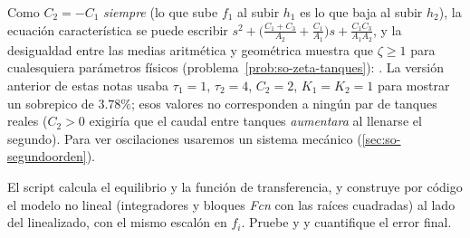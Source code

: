 \begin{cuidado}
Como $C_2=-C_1$ \emph{siempre} (lo que sube $f_1$ al subir $h_1$ es lo que baja al subir $h_2$), la ecuación característica se puede escribir $s^2+\bigl(\tfrac{C_1+C_3}{A_2}+\tfrac{C_1}{A_1}\bigr)s+\tfrac{C_1C_3}{A_1A_2}$, y la desigualdad entre las medias aritmética y geométrica muestra que $\zeta\geq1$ para cualesquiera parámetros físicos (problema~\ref{prob:so-zeta-tanques}): . La versión anterior de estas notas usaba $\tau_1=1$, $\tau_2=4$, $C_2=2$, $K_1=K_2=1$ para mostrar un sobrepico de $3.78\%$; esos valores no corresponden a ningún par de tanques reales ($C_2>0$ exigiría que el caudal entre tanques \emph{aumentara} al llenarse el segundo). Para ver oscilaciones usaremos un sistema mecánico (\cref{sec:so-segundoorden}).
\end{cuidado}

\begin{modelo}
El script  calcula el equilibrio y la función de transferencia, y construye por código el modelo no lineal (integradores y bloques \emph{Fcn} con las raíces cuadradas) al lado del linealizado, con el mismo escalón en $f_i$. Pruebe  y  y cuantifique el error final.
\end{modelo}

